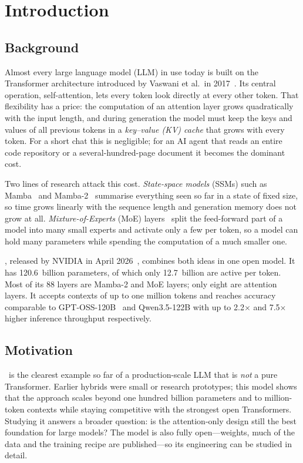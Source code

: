 \chapter{Introduction}
\label{ch:intro}

\section{Background}

Almost every large language model (LLM) in use today is built on the
Transformer architecture introduced by Vaswani et al.\ in
2017~\cite{vaswani2017attention}. Its central operation, self-attention, lets
every token look directly at every other token. That flexibility has a price:
the computation of an attention layer grows quadratically with the input
length, and during generation the model must keep the keys and values of all
previous tokens in a \emph{key--value (KV) cache} that grows with every token.
For a short chat this is negligible; for an AI agent that reads an entire code
repository or a several-hundred-page document it becomes the dominant cost.

Two lines of research attack this cost. \emph{State-space models} (SSMs) such
as Mamba~\cite{gu2023mamba} and Mamba-2~\cite{dao2024mamba2} summarise
everything seen so far in a state of fixed size, so time grows linearly with
the sequence length and generation memory does not grow at all.
\emph{Mixture-of-Experts} (MoE) layers~\cite{shazeer2017moe,lepikhin2020gshard}
split the feed-forward part of a model into many small experts and activate
only a few per token, so a model can hold many parameters while spending the
computation of a much smaller one.

\NS, released by NVIDIA in April 2026~\cite{nvidia2026super}, combines both
ideas in one open model. It has 120.6~billion parameters, of which only
12.7~billion are active per token. Most of its 88 layers are Mamba-2 and MoE
layers; only eight are attention layers. It accepts contexts of up to one
million tokens and reaches accuracy comparable to
GPT-OSS-120B~\cite{openai2025gptoss} and Qwen3.5-122B with up to 2.2$\times$
and 7.5$\times$ higher inference throughput respectively.

\section{Motivation}

\NS\ is the clearest example so far of a production-scale LLM that is
\emph{not} a pure Transformer. Earlier hybrids were small or research
prototypes; this model shows that the approach scales beyond one hundred
billion parameters and to million-token contexts while staying competitive with
the strongest open Transformers. Studying it answers a broader question: is
the attention-only design still the best foundation for large models? The
model is also fully open---weights, much of the data and the training recipe
are published---so its engineering can be studied in detail.


